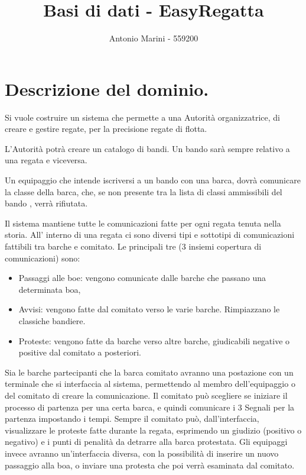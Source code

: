 \documentclass{article}
\title{Basi di dati - EasyRegatta}
\author{Antonio Marini - 559200}
\begin{document}
\maketitle
\newpage

\section{Descrizione del dominio.}

\begin{flushleft}
Si vuole costruire un sistema che permette a una Autorità organizzatrice,
di creare e gestire regate, per la precisione regate di flotta.
\end{flushleft}

\begin{flushleft}
L'Autorità potrà creare un catalogo di bandi. Un bando sarà sempre relativo a una regata e viceversa. 
\end{flushleft}

\begin{flushleft}
Un equipaggio che intende iscriversi a un bando con una barca, dovrà comunicare la classe della barca, che, se non presente tra la lista di classi ammissibili del bando , verrà rifiutata.
\end{flushleft}

\begin{flushleft}
Il sistema mantiene tutte le comunicazioni fatte per ogni regata tenuta nella storia.
All' interno di una regata ci sono diversi tipi e sottotipi di comunicazioni fattibili tra barche e comitato.
Le principali tre (3 insiemi copertura di comunicazioni) sono: 
\begin{itemize}
    \item Passaggi alle boe: vengono comunicate dalle barche che passano una determinata boa, 
    \item Avvisi: vengono fatte dal comitato verso le varie barche. Rimpiazzano le classiche bandiere.
    \item Proteste: vengono fatte da barche verso altre barche, giudicabili negative o positive dal comitato a posteriori.
\end{itemize}
Sia le barche partecipanti che la barca comitato avranno una postazione con un terminale che si interfaccia al sistema, permettendo al membro dell'equipaggio o del comitato di creare la comunicazione.
Il comitato può scegliere se iniziare il processo di partenza per una certa barca, e quindi comunicare i 3 Segnali per la partenza impostando i tempi.
Sempre il comitato può, dall'interfaccia, visualizzare le proteste fatte durante la regata, esprimendo un giudizio (positivo o negativo) e i punti di penalità da detrarre alla barca protestata.
Gli equipaggi invece avranno un'interfaccia diversa, con la possibilità di inserire un nuovo passaggio alla boa, o inviare una protesta che poi verrà esaminata dal comitato.
\end{flushleft}
\end{document}
